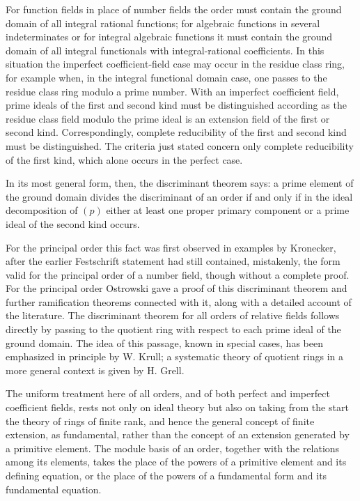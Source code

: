 \documentclass[
  12pt,
]{article}
\begin{document}
For function fields in place of number fields the order must contain the
ground domain of all integral rational functions; for algebraic
functions in several indeterminates or for integral algebraic functions
it must contain the ground domain of all integral functionals with
integral-rational coefficients. In this situation the imperfect
coefficient-field case may occur in the residue class ring, for example
when, in the integral functional domain case, one passes to the residue
class ring modulo a prime number. With an imperfect coefficient field,
prime ideals of the first and second kind must be distinguished
according as the residue class field modulo the prime ideal is an
extension field of the first or second kind. Correspondingly, complete
reducibility of the first and second kind must be distinguished. The
criteria just stated concern only complete reducibility of the first
kind, which alone occurs in the perfect case.

In its most general form, then, the discriminant theorem says: a prime
element of the ground domain divides the discriminant of an order if and
only if in the ideal decomposition of \((p)\) either at least one proper
primary component or a prime ideal of the second kind occurs.

For the principal order this fact was first observed in examples by
Kronecker, after the earlier Festschrift statement had still contained,
mistakenly, the form valid for the principal order of a number field,
though without a complete proof. For the principal order Ostrowski gave
a proof of this discriminant theorem and further ramification theorems
connected with it, along with a detailed account of the literature. The
discriminant theorem for all orders of relative fields follows directly
by passing to the quotient ring with respect to each prime ideal of the
ground domain. The idea of this passage, known in special cases, has
been emphasized in principle by W. Krull; a systematic theory of
quotient rings in a more general context is given by H. Grell.

The uniform treatment here of all orders, and of both perfect and
imperfect coefficient fields, rests not only on ideal theory but also on
taking from the start the theory of rings of finite rank, and hence the
general concept of finite extension, as fundamental, rather than the
concept of an extension generated by a primitive element. The module
basis of an order, together with the relations among its elements, takes
the place of the powers of a primitive element and its defining
equation, or the place of the powers of a fundamental form and its
fundamental equation.
\end{document}

